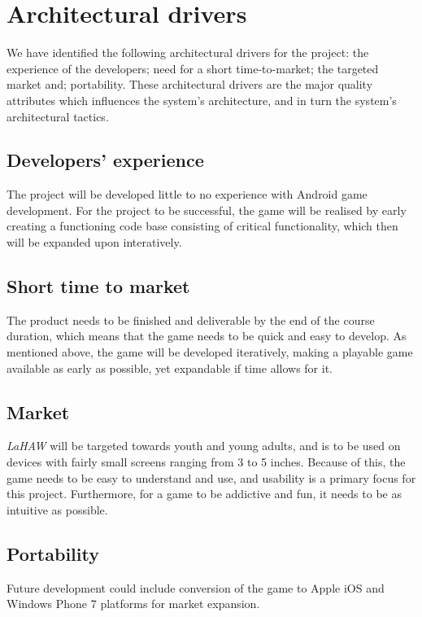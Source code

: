 \chapter{Architectural drivers}
We have identified the following architectural drivers for the project: the experience of the developers; need for a short time-to-market; the targeted market and; portability. These architectural drivers are the major quality attributes which influences the system's architecture, and in turn the system's architectural tactics\cite{pensum}.


	\section{Developers' experience}
	The project will be developed little to no experience with Android game development. For the project to be successful, the game will be realised by early creating a functioning code base consisting of critical functionality, which then will be expanded upon interatively.

	\section{Short time to market}
	The product needs to be finished and deliverable by the end of the course duration, which means that the game needs to be quick and easy to develop. As mentioned above, the game will be developed iteratively, making a playable game available as early as possible, yet expandable if time allows for it.

	\section{Market}
	\emph{LaHAW} will be targeted towards youth and young adults, and is to be used on devices with fairly small screens ranging from 3 to 5 inches. Because of this, the game needs to be easy to understand and use, and usability is a primary focus for this project. Furthermore, for a game to be addictive and fun, it needs to be as intuitive as possible.

	\section{Portability}
	Future development could include conversion of the game to Apple iOS and Windows Phone 7 platforms for market expansion.